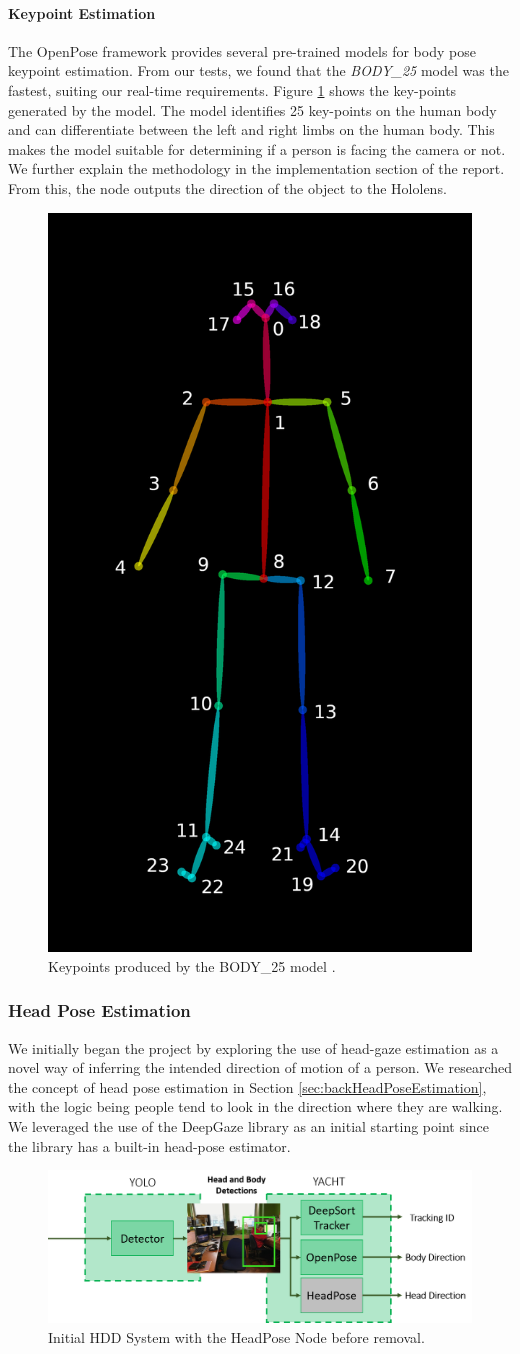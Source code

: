 \paragraph{Keypoint Estimation} \label{des:body_25}
The OpenPose framework provides several pre-trained models for body pose keypoint estimation. From our tests, we found that the \textit{BODY\_25} model was the fastest, suiting our real-time requirements. Figure \ref{fig:bodyKeyPoints} shows the key-points generated by the model. The model identifies 25 key-points on the human body and can differentiate between the left and right limbs on the human body. This makes the model suitable for determining if a person is facing the camera or not. We further explain the methodology in the implementation section of the report. From this, the node outputs the direction of the object to the Hololens.

\begin{figure}[ht]
    \centering
    \includegraphics[width=0.2\linewidth]{img/chapter4_analysis/keypoints_pose_25.png}
    \caption{Keypoints produced by the BODY\_25 model \cite{Cao2017}.}
    \label{fig:bodyKeyPoints}
\end{figure}


\subsubsection{Head Pose Estimation}
We initially began the project by exploring the use of head-gaze estimation as a novel way of inferring the intended direction of motion of a person. We researched the concept of head pose estimation in Section \ref{sec:backHeadPoseEstimation}, with the logic being people tend to look in the direction where they are walking. We leveraged the use of the DeepGaze library as an initial starting point \cite{Patacchiola2017a} since the library has a built-in head-pose estimator. 

\begin{figure}[ht]
    \centering
    \includegraphics[width=1.0\linewidth]{img/chapter4_analysis/hddSystemHeadPose.png}
    \caption{Initial HDD System with the HeadPose Node before removal.}
    \label{fig:headPoseHDD}
    \vspace{-1\baselineskip}
\end{figure}

